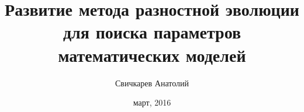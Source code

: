 \documentclass{beamer}
\begin{document}
\title[DEEP]
{Развитие метода разностной эволюции
для поиска параметров математических моделей}
\author{Свичкарев Анатолий}
\date{март, 2016}

\frame{\titlepage} 

\end{document}
